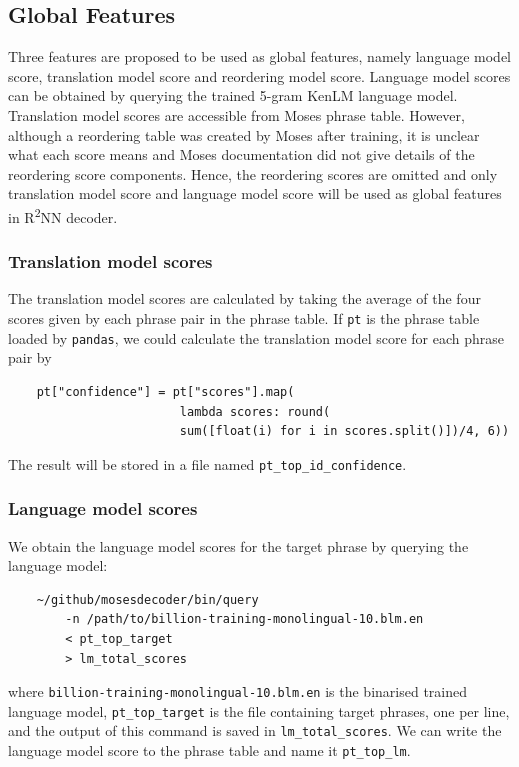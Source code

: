\documentclass[12pt,a4paper,twoside,openright]{report}
\begin{document}
\subsection{Global Features} \label{section:global_features}
Three features are proposed to be used as global features, namely language model score, translation model score and reordering model score. Language model scores can be obtained by querying the trained 5-gram KenLM language model. Translation model scores are accessible from Moses phrase table. However, although a reordering table was created by Moses after training, it is unclear what each score means and Moses documentation did not give details of the reordering score components. Hence, the reordering scores are omitted and only translation model score and language model score will be used as global features in R\textsuperscript{2}NN decoder.

\subsubsection{Translation model scores}
The translation model scores are calculated by taking the average of the four scores given by each phrase pair in the phrase table. If \texttt{pt} is the phrase table loaded by \texttt{pandas}, we could calculate the translation model score for each phrase pair by

\begin{verbatim}
    pt["confidence"] = pt["scores"].map(
                        lambda scores: round(
                        sum([float(i) for i in scores.split()])/4, 6))
\end{verbatim}

The result will be stored in a file named \texttt{pt\_top\_id\_confidence}.

\subsubsection{Language model scores}
We obtain the language model scores for the target phrase by querying the language model:
\begin{verbatim}
    ~/github/mosesdecoder/bin/query 
        -n /path/to/billion-training-monolingual-10.blm.en 
        < pt_top_target
        > lm_total_scores
\end{verbatim}

where \texttt{billion-training-monolingual-10.blm.en} is the binarised trained language model, \texttt{pt\_top\_target} is the file containing target phrases, one per line, and the output of this command is saved in \texttt{lm\_total\_scores}. We can write the language model score to the phrase table and name it \texttt{pt\_top\_lm}.
\end{document}
